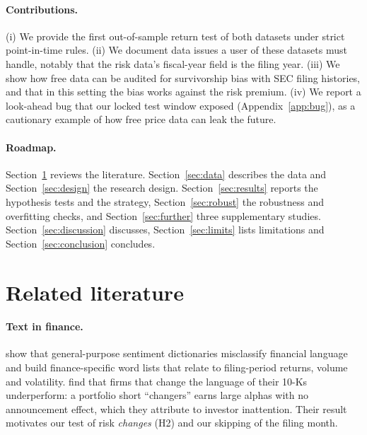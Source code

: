 \documentclass[11pt,a4paper]{article}
\begin{document}
\paragraph{Contributions.} (i) We provide the first out-of-sample return test of both datasets under strict point-in-time
rules. (ii) We document data issues a user of these datasets must handle, notably that the risk data's fiscal-year field
is the filing year. (iii) We show how free data can be audited for survivorship bias with SEC filing histories, and that
in this setting the bias works against the risk premium. (iv) We report a look-ahead bug that our locked test window
exposed (Appendix~\ref{app:bug}), as a cautionary example of how free price data can leak the future.

\paragraph{Roadmap.} Section~\ref{sec:lit} reviews the literature. Section~\ref{sec:data} describes the data and
Section~\ref{sec:design} the research design. Section~\ref{sec:results} reports the hypothesis tests and the strategy,
Section~\ref{sec:robust} the robustness and overfitting checks, and Section~\ref{sec:further} three supplementary studies.
Section~\ref{sec:discussion} discusses, Section~\ref{sec:limits} lists limitations and Section~\ref{sec:conclusion} concludes.

\section{Related literature}\label{sec:lit}

\paragraph{Text in finance.} \citet{loughran2011} show that general-purpose sentiment dictionaries misclassify financial
language and build finance-specific word lists that relate to filing-period returns, volume and volatility.
\citet{cohen2020} find that firms that change the language of their 10-Ks underperform: a portfolio short ``changers''
earns large alphas with no announcement effect, which they attribute to investor inattention. Their result motivates our
test of risk \emph{changes} (H2) and our skipping of the filing month.
\end{document}
